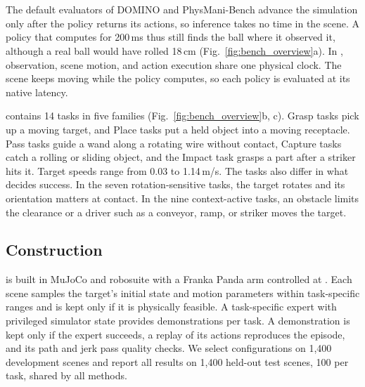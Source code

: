 \section{\bench}
\label{sec:bench}

The default evaluators of DOMINO \cite{domino} and PhysMani-Bench \cite{physmani}
advance the simulation only after the policy returns its actions, so inference takes
no time in the scene.
A policy that computes for 200\,ms thus still finds the ball where it observed it,
although a real ball would have rolled 18\,cm (Fig.~\ref{fig:bench_overview}a).
In \bench, observation, scene motion, and action execution share one physical clock.
The scene keeps moving while the policy computes, so each policy is evaluated at its
native latency.

\bench contains 14 tasks in five families (Fig.~\ref{fig:bench_overview}b, c).
Grasp tasks pick up a moving target, and Place tasks put a held object into a moving
receptacle.
Pass tasks guide a wand along a rotating wire without contact, Capture tasks catch a
rolling or sliding object, and the Impact task grasps a part after a striker hits it.
Target speeds range from 0.03 to 1.14\,m/s.
The tasks also differ in what decides success.
In the seven rotation-sensitive tasks, the target rotates and its orientation matters
at contact.
In the nine context-active tasks, an obstacle limits the clearance or a driver such as
a conveyor, ramp, or striker moves the target.

\subsection{Construction}
\label{sec:bench_construction}
\bench is built in MuJoCo and robosuite \cite{mujoco,robosuite} with a Franka Panda arm
controlled at \cfgControlRate{}.
Each scene samples the target's initial state and motion parameters within
task-specific ranges and is kept only if it is physically feasible.
A task-specific expert with privileged simulator state provides \cfgDemos{}
demonstrations per task.
A demonstration is kept only if the expert succeeds, a replay of its actions reproduces
the episode, and its path and jerk pass quality checks.
We select configurations on 1{,}400 development scenes and report all \bench results on
1{,}400 held-out test scenes, 100 per task, shared by all methods.

